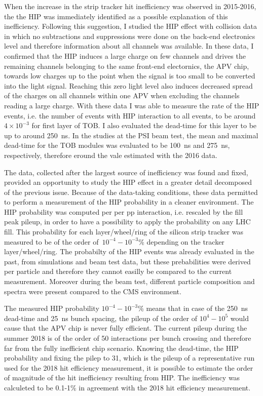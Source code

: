 When the increase in the strip tracker hit inefficiency was observed in 2015-2016, the the HIP was immediately identified as a possible explanation of this inefficiency. Following this suggestion, I studied the HIP effect with collision data in which no subtractions and suppressions were done on the back-end electronics level and therefore information about all channels was available. In these data, I confirmed that the HIP induces a large charge on few channels and drives the remaining channels belonging to the same front-end electornics, the APV chip, towards low charges up to the point when the signal is too small to be converted into the light signal. Reaching this zero light level also induces decreased spread of the charges on all channels within one APV when excluding the channels reading a large charge. With these data I was able to measure the rate of the HIP events, i.e. the number of events with HIP interaction to all events, to be around $4 \times 10^{-3}$ for first layer of TOB. I also evaluated the dead-time for this layer to be up to around 250~ns. In the studies at the PSI beam test, the mean and maximal dead-time for the TOB modules was evaluated to be 100~ns and 275~ns, respectively, therefore eround the vale estimated with the 2016 data.  


The data, collected after the largest source of inefficiency was found and fixed, provided an opportunity to study the HIP effect in a greater detail decomposed of the previous issue. Because of the data-taking conditions, these data permitted to perform a  measurement of the HIP probability in a cleaner environment. The HIP probability was computed per per pp interaction, i.e. rescaled by the fill peak pileup, in order to have a possibility to apply the probability on any LHC fill. This probability for each layer/wheel/ring of the silicon strip tracker was measured to be of the order of~$10^{-4}-10^{-3}$\% depending on the tracker layer/wheel/ring. The probabilty of the HIP events was already evaluated in the past, from simulations and beam test data, but these prebabilities were derived per particle and therefore they cannot easilly be compared to the current measurement. Moreover during the beam test, different particle composition and spectra were present compared to the CMS environment.

The measured HIP probability  $10^{-4}-10^{-3}$\% means that in case of the 250~ns dead-time and 25~ns bunch spacing, the pileup of the order of $10^4-10^5$ would cause that the APV chip is never fully efficient. The current pileup during the summer 2018 is of the order of 50 interactions per bunch crossing and therefore far from the fully inefficient chip scenario. Knowing the dead-time, the HIP probability and fixing the pilep to 31, which is the pileup of a representative run used for the 2018 hit efficiency measurement, it is possible to estimate the order of magnitude of the hit inefficiency resulting from HIP. The inefficiency was calculeted to be 0.1-1\% in agreement with the 2018 hit efficiency measurement.


